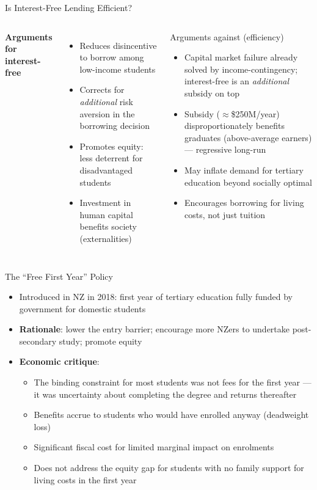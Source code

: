\documentclass[aspectratio=169, 12pt]{beamer}
\begin{document}
\begin{frame}{Is Interest-Free Lending Efficient?}
  \begin{columns}
      \footnotesize \textbf{Arguments for interest-free}
      \begin{itemize}
        \item Reduces disincentive to borrow among low-income students
        \item Corrects for \emph{additional} risk aversion in the borrowing decision
        \item Promotes equity: less deterrent for disadvantaged students
        \item Investment in human capital benefits society (externalities)
      \end{itemize}
      \begin{alertblock}{Arguments against (efficiency)}
        \footnotesize
        \begin{itemize}
          \item Capital market failure already solved by income-contingency; interest-free
                is an \emph{additional} subsidy on top
          \item Subsidy ($\approx$\$250M/year) disproportionately benefits graduates
                (above-average earners) --- regressive long-run
          \item May inflate demand for tertiary education beyond socially optimal
          \item Encourages borrowing for living costs, not just tuition
        \end{itemize}
      \end{alertblock}
  \end{columns}
\end{frame}

\begin{frame}{The ``Free First Year'' Policy}
  \small
  \begin{itemize}
    \item Introduced in NZ in 2018: first year of tertiary education fully funded by
          government for domestic students
    \item \textbf{Rationale}: lower the entry barrier; encourage more NZers to undertake
          post-secondary study; promote equity
    \item \textbf{Economic critique}:
    \begin{itemize}
      \item The binding constraint for most students was not fees for the first year ---
            it was uncertainty about completing the degree and returns thereafter
      \item Benefits accrue to students who would have enrolled anyway (deadweight loss)
      \item Significant fiscal cost for limited marginal impact on enrolments
      \item Does not address the equity gap for students with no family support for
            living costs in the first year
    \end{itemize}
  \end{itemize}
\end{frame}
\end{document}

